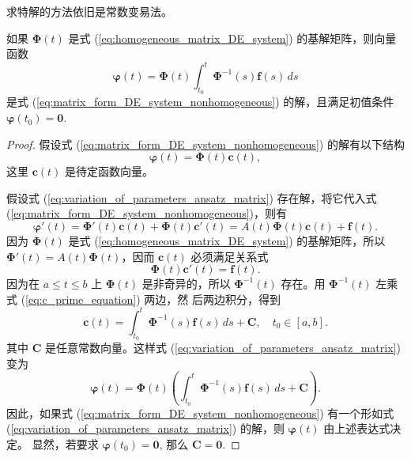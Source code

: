 求特解的方法依旧是常数变易法。


\begin{theorem}[非齐次方程组特解]\label{thm:particular_solution_nonhomogeneous_system_integral}
如果 $\boldsymbol{\Phi}(t)$ 是式 (\ref{eq:homogeneous_matrix_DE_system}) 的基解矩阵，则向量函数
\begin{equation}
\boldsymbol{\varphi}(t) = \boldsymbol{\Phi}(t)\int_{t_0}^{t} \boldsymbol{\Phi}^{-1}(s)\mathbf{f}(s)\,ds \label{eq:particular_solution_integral_form_final}
\end{equation}
是式 (\ref{eq:matrix_form_DE_system_nonhomogeneous}) 的解，且满足初值条件 $\boldsymbol{\varphi}(t_0) = \mathbf{0}$.
\end{theorem}
\begin{proof}
假设式 (\ref{eq:matrix_form_DE_system_nonhomogeneous}) 的解有以下结构
\begin{equation}
\boldsymbol{\varphi}(t) = \boldsymbol{\Phi}(t)\mathbf{c}(t), \label{eq:variation_of_parameters_ansatz_matrix}
\end{equation}
这里 $\mathbf{c}(t)$ 是待定函数向量。

假设式 (\ref{eq:variation_of_parameters_ansatz_matrix}) 存在解，将它代入式 (\ref{eq:matrix_form_DE_system_nonhomogeneous})，则有
$$\boldsymbol{\varphi}'(t) = \boldsymbol{\Phi}'(t)\mathbf{c}(t) + \boldsymbol{\Phi}(t)\mathbf{c}'(t) = A(t)\boldsymbol{\Phi}(t)\mathbf{c}(t)+\mathbf{f}(t).$$
因为 $\boldsymbol{\Phi}(t)$ 是式 (\ref{eq:homogeneous_matrix_DE_system}) 的基解矩阵，所以 $\boldsymbol{\Phi}'(t) = A(t)\boldsymbol{\Phi}(t)$，因而 $\mathbf{c}(t)$ 必须满足关系式
\begin{equation}
\boldsymbol{\Phi}(t)\mathbf{c}'(t)=\mathbf{f}(t). \label{eq:c_prime_equation}
\end{equation}
因为在 $a \le t \le b$ 上 $\boldsymbol{\Phi}(t)$ 是非奇异的，所以 $\boldsymbol{\Phi}^{-1}(t)$ 存在。用 $\boldsymbol{\Phi}^{-1}(t)$ 左乘式 (\ref{eq:c_prime_equation}) 两边，然
后两边积分，得到
\begin{equation}
\mathbf{c}(t) = \int_{t_0}^{t} \boldsymbol{\Phi}^{-1}(s)\mathbf{f}(s)\,ds + \mathbf{C}, \quad t_0 \in [a,b]. \label{eq:c_t_integral}
\end{equation}
其中 $\mathbf{C}$ 是任意常数向量。这样式 (\ref{eq:variation_of_parameters_ansatz_matrix}) 变为
$$\boldsymbol{\varphi}(t) = \boldsymbol{\Phi}(t)\left(\int_{t_0}^{t} \boldsymbol{\Phi}^{-1}(s)\mathbf{f}(s)\,ds + \mathbf{C}\right).$$
因此，如果式 (\ref{eq:matrix_form_DE_system_nonhomogeneous}) 有一个形如式 (\ref{eq:variation_of_parameters_ansatz_matrix}) 的解，则 $\boldsymbol{\varphi}(t)$ 由上述表达式决定。
显然，若要求 $\boldsymbol{\varphi}(t_0) = \mathbf{0}$, 那么 $\mathbf{C} = \mathbf{0}$.

\end{proof}

